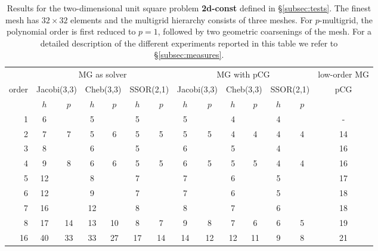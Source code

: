 \documentclass[smallcondensed,final]{svjour3}     %
\newcommand{\gsnote}[1]{\textcolor{blue}{GS: #1}}
\begin{document}

\begin{table}
  \caption{\label{tab:box} Results for the two-dimensional unit square
    problem {\bf 2d-const} defined in \S\ref{subsec:tests}. The finest
    mesh has $32\times 32$ elements and the multigrid hierarchy
    consists of  three meshes.  For $p$-multigrid, the
    polynomial order is first reduced to $p=1$, followed by two
    geometric coarsenings of the mesh.  For a detailed description of
    the different experiments reported in this table we refer to
    \S\ref{subsec:measures}.}  \centering
  \begin{tabular}{|r|c c|c c|c c||c c|c c|c c||c|} 
    \hline
    & \multicolumn{6}{c||}{MG as solver} & \multicolumn{6}{c||}{MG
      with pCG} & \!\!low-order MG\!\! \\
    \cline{2-13}
    \!\!\! order \!\!\!\! &  \multicolumn{2}{c|}{\!\!\scriptsize  Jacobi(3,3)\!\!} &  \multicolumn{2}{c|}{\!\!\scriptsize Cheb(3,3)\!\!} & \multicolumn{2}{c||}{\!\!\scriptsize  SSOR(2,1)\!\!} & \multicolumn{2}{c|}{\!\!\scriptsize Jacobi(3,3)\!\!} &  \multicolumn{2}{c|}{\!\!\scriptsize Cheb(3,3)\!\!} & \multicolumn{2}{c||}{\!\!\scriptsize SSOR(2,1)\!\!} & pCG \\
\hline
 & $h$ & $p$ & $h$ & $p$& $h$ & $p$& $h$ & $p$& $h$ & $p$& $h$ & $p$&
~ \\
 \cline{2-13}
1 & 6 & & 5 & & 5 & & 5 & & 4 & & 4 & & -   \\
2 & 7 & 7 & 5 & 6 & 5 & 5 & 5 & 5 & 4 & 4 & 4 & 4 & 14  \\
3 & 8 & & 6 & & 5 & & 6 & & 5 & & 4 & & 16   \\
4 & 9 & 8 & 6 & 6 & 5 & 5 & 6 & 5 & 5 & 5 & 4 & 4 & 16  \\
5 & 12 & & 8 & & 7 & & 7 & & 6 & & 5 & & 17 \\
6 & 12 & & 9 & & 7 & & 7 & & 6 & & 5 & & 18 \\
7 & 16 & & 12 & & 8 & & 8 & & 7 & & 6 & & 18  \\
8 & 17 & 14 & 13 & 10 & 8 & 7 & 9 & 8 & 7 & 6 & 6 & 5 & 19 \\
16 & 40 & 33 & 33 & 27 & 17 & 14 & 14 & 12 & 12 & 11 & 9 & 8 & 21 \\
\hline
  \end{tabular}
\end{table}
\end{document}
